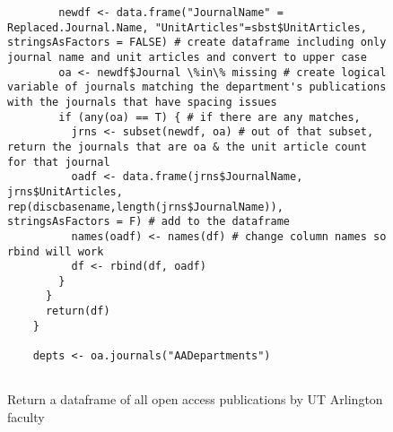 \documentclass{article}
\begin{document}
\begin{figure}[htpb]
\begin{lstlisting}
	    newdf <- data.frame("JournalName" = Replaced.Journal.Name, "UnitArticles"=sbst$UnitArticles, stringsAsFactors = FALSE) # create dataframe including only journal name and unit articles and convert to upper case
	    oa <- newdf$Journal \%in\% missing # create logical variable of journals matching the department's publications with the journals that have spacing issues
	    if (any(oa) == T) { # if there are any matches, 
	      jrns <- subset(newdf, oa) # out of that subset, return the journals that are oa & the unit article count for that journal
	      oadf <- data.frame(jrns$JournalName, jrns$UnitArticles, rep(discbasename,length(jrns$JournalName)), stringsAsFactors = F) # add to the dataframe
	      names(oadf) <- names(df) # change column names so rbind will work
	      df <- rbind(df, oadf)
	    }
	  }
	  return(df)
	}
	
	depts <- oa.journals("AADepartments")
	
	\end{lstlisting}
	
	\caption{Return a dataframe of all open access publications by UT Arlington faculty}
\end{figure}
\end{document}
